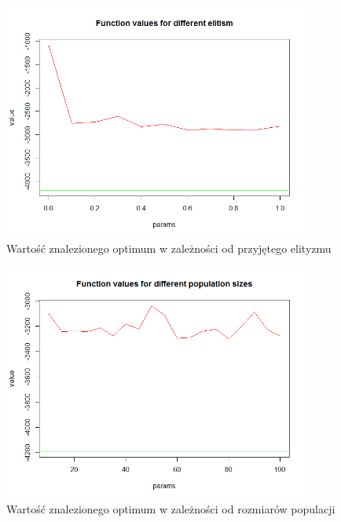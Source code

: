 \documentclass[11pt, a4paper]{article}
\begin{document}
\begin{figure}[H]
	\begin{center}
		\includegraphics[width=0.9\textwidth]{./assets/Schwefel4.png} %
		\caption{Wartość znalezionego optimum w zależności od przyjętego elityzmu}
		\label{fig:gulf7}
	\end{center}
\end{figure}
\begin{figure}[H]
	\begin{center}
		\includegraphics[width=0.9\textwidth]{./assets/Schwefel5.png} %
		\caption{Wartość znalezionego optimum w zależności od rozmiarów populacji}
		\label{fig:gulf7}
	\end{center}
\end{figure}
\end{document}
